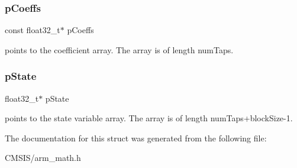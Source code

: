 \subsubsection{\texorpdfstring{pCoeffs}{pCoeffs}}
{\footnotesize\ttfamily const float32\+\_\+t$\ast$ p\+Coeffs}

points to the coefficient array. The array is of length num\+Taps. \mbox{\label{structarm__fir__instance__f32_a335c87e6fdc4b96601d95a5de8b9c463}} 
\subsubsection{\texorpdfstring{pState}{pState}}
{\footnotesize\ttfamily float32\+\_\+t$\ast$ p\+State}

points to the state variable array. The array is of length num\+Taps+block\+Size-\/1. 

The documentation for this struct was generated from the following file\+:\begin{DoxyCompactItemize}
\item 
C\+M\+S\+I\+S/arm\+\_\+math.\+h\end{DoxyCompactItemize}

